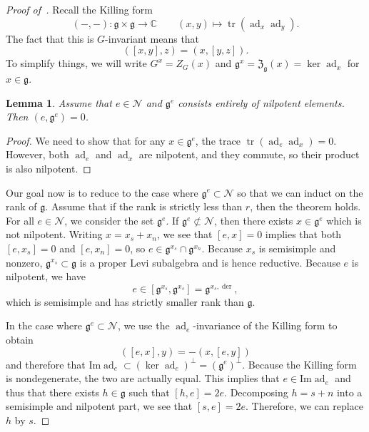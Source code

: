 \documentclass{amsart}
\newtheorem{lem}[thm]{Lemma}
\theoremstyle{definition}
\theoremstyle{remark}
\theoremstyle{plain}
\theoremstyle{definition}
\theoremstyle{remark}
\newcommand{\Ima}{\mathrm{Im}}
\newcommand{\C}{\mathbb{C}}
\newcommand{\g}{\mathfrak{g}}
\newcommand{\mc}[1]{\mathcal{#1}}
\newcommand{\mf}[1]{\mathfrak{#1}}
\newcommand{\on}[1]{\operatorname{#1}}
\newcommand{\1}{\mathbf{1}}
\newcommand{\2}{\mathbf{2}}
\newcommand{\3}{\mathbf{3}}
\DeclareMathOperator{\ad}{ad}
\begin{document}
\begin{proof}[Proof of~]
    Recall the Killing form
    \[ (-,-) \colon \g \times \g \to \C \qquad (x,y) \mapsto \on{tr}(\ad_x \ad_y). \]
    The fact that this is \(G\)-invariant means that
    \[ ([x,y], z) = (x,[y,z]). \]
    To simplify things, we will write \(G^x = Z_G(x)\) and \(\g^x = \mf{Z}_{\g}(x) = \ker \ad_x\) for \(x \in \g\).

    \begin{lem}
        Assume that \(e \in \mc{N}\) and \(\g^e\) consists entirely of nilpotent elements. Then \((e, \g^e) = 0\).
    \end{lem}

    \begin{proof}
        We need to show that for any \(x \in \g^e\), the trace \(\on{tr}(\ad_e \ad_x) = 0\). However, both \(\ad_e\) and \(\ad_x\) are nilpotent, and they commute, so their product is also nilpotent.
    \end{proof}

    Our goal now is to reduce to the case where \(\g^e \subset \mc{N}\) so that we can induct on the rank of \(\g\). Assume that if the rank is strictly less than \(r\), then the theorem holds. For all \(e \in \mc{N}\), we consider the set \(\g^e\). If \(\g^e \not\subset \mc{N}\), then there exists \(x \in \g^e\) which is not nilpotent. Writing \(x = x_s + x_n\), we see that \([e,x] = 0\) implies that both \([e,x_s] = 0\) and \([e, x_n] = 0\), so \(e \in \g^{x_s} \cap \g^{x_n}\). Because \(x_s\) is semisimple and nonzero, \(\g^{x_s} \subset \g\) is a proper Levi subalgebra and is hence reductive. Because \(e\) is nilpotent, we have
    \[ e \in [\g^{x_s}, \g^{x_s}] = \g^{x_s, \on{der}}, \]
    which is semisimple and has strictly smaller rank than \(\g\).

    In the case where \(\g^e \subset \mc{N}\), we use the \(\ad_e\)-invariance of the Killing form to obtain
    \[ ([e,x], y) = -(x, [e,y]) \]
    and therefore that \(\Ima \ad_e \subset (\ker \ad_e)^{\perp} = (\g^e)^{\perp}\). Because the Killing form is nondegenerate, the two are actually equal. This implies that \(e \in \Ima \ad_e\) and thus that there exists \(h \in \g\) such that \([h,e] = 2e\). Decomposing \(h = s+n\) into a semisimple and nilpotent part, we see that \([s,e] = 2e\). Therefore, we can replace \(h\) by \(s\).


\end{proof}
\end{document}
